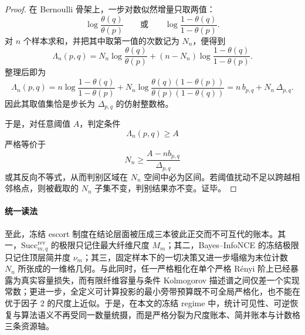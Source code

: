 \begin{proof}
在 Bernoulli 骨架上，一步对数似然增量只取两值：
\[
\log\frac{\theta(q)}{\theta(p)}
\qquad\text{或}\qquad
\log\frac{1-\theta(q)}{1-\theta(p)}.
\]
对 \(n\) 个样本求和，并把其中取第一值的次数记为 \(N_n\)，便得到
\[
\Lambda_n(p,q)
=
N_n\log\frac{\theta(q)}{\theta(p)}
+
(n-N_n)\log\frac{1-\theta(q)}{1-\theta(p)}.
\]
整理后即为
\[
\Lambda_n(p,q)
=
n\log\frac{1-\theta(q)}{1-\theta(p)}
+
N_n\log\frac{\theta(q)(1-\theta(p))}{\theta(p)(1-\theta(q))}
=
n\,b_{p,q}+N_n\,\Delta_{p,q}.
\]
因此其取值集恰是步长为 \(\Delta_{p,q}\) 的仿射整数格。

于是，对任意阈值 \(A\)，判定条件
\[
\Lambda_n(p,q)\ge A
\]
严格等价于
\[
N_n\ge \frac{A-nb_{p,q}}{\Delta_{p,q}}
\]
或其反向不等式，从而判别区域在 \(N_n\) 空间中必为区间。若阈值扰动不足以跨越相邻格点，则被截取的 \(N_n\) 子集不变，判别结果亦不变。证毕。
\end{proof}

\paragraph{统一读法}
至此，冻结 escort 制度在结论层面被压成三本彼此正交而不可互代的账本。其一，\(\mathrm{Succ}^{\mathrm{rev}}_{m,q}\) 的极限只记住最大纤维尺度 \(M_m\)；其二，Bayes--InfoNCE 的冻结极限只记住顶层简并度 \(\nu_m\)；其三，固定样本下的一切决策又进一步塌缩为末位计数 \(N_n\) 所张成的一维格几何。与此同时，任一严格粗化在单个严格 Rényi 阶上已经暴露为真实容量损失，而有限纤维容量与条件 Kolmogorov 描述谱之间仅差一个实现常数；更进一步，全定义可计算投影的最小旁带预算既不可全局严格化，也不能在优于因子 \(2\) 的尺度上近似。于是，在本文的冻结 regime 中，统计可见性、可逆恢复与算法语义不再受同一数量统摄，而是严格分裂为尺度账本、简并账本与计数格三条资源轴。

\endinput
